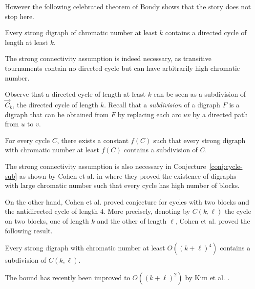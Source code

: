 \documentclass{endm}
\begin{document}
However the following celebrated theorem of Bondy shows that  the story does not stop here.

\begin{theorem}\label{thm:bondy}
Every strong digraph of chromatic number at least $k$ contains a directed cycle of length at least $k$.
\end{theorem} 

The strong connectivity assumption is indeed necessary, as transitive tournaments contain no directed cycle but can have arbitrarily  high chromatic number. 

Observe that a directed cycle of length at least $k$ can be seen as a subdivision of $\vec{C}_k$, the directed cycle of length $k$.
Recall that a {\it subdivision} of a digraph $F$ is a digraph that can be obtained from $F$ by replacing each arc $uv$ by a directed path from $u$ to $v$.

\begin{conjecture}\label{conj:cycle-sub}
For every cycle $C$, there exists a constant $f(C)$ such that every strong digraph with chromatic number at least $f(C)$ contains a subdivision of $C$.
\end{conjecture}

The strong connectivity assumption is also necessary in Conjecture~\ref{conj:cycle-sub} as shown by Cohen et al. in  \cite{CHLN16}
where they proved the existence of digraphs with large chromatic number such that every cycle has high number of blocks.


On the other hand, Cohen et al.  \cite{CHLN16} proved conjecture for cycles with two blocks and the antidirected cycle of length $4$.
More precisely, denoting by $C(k,\ell)$ the cycle on two blocks, one of length $k$ and the other of length $\ell$,
 Cohen et al. \cite{CHLN16} proved the following result.
\begin{theorem}\label{th:ckl}
Every strong digraph with chromatic number at least $O((k+\ell)^4)$ contains a subdivision of $C(k,\ell)$.
\end{theorem} 
The bound has recently been improved to $O((k+\ell)^2)$  by Kim et al. \cite{KKPM}.  
\end{document}
